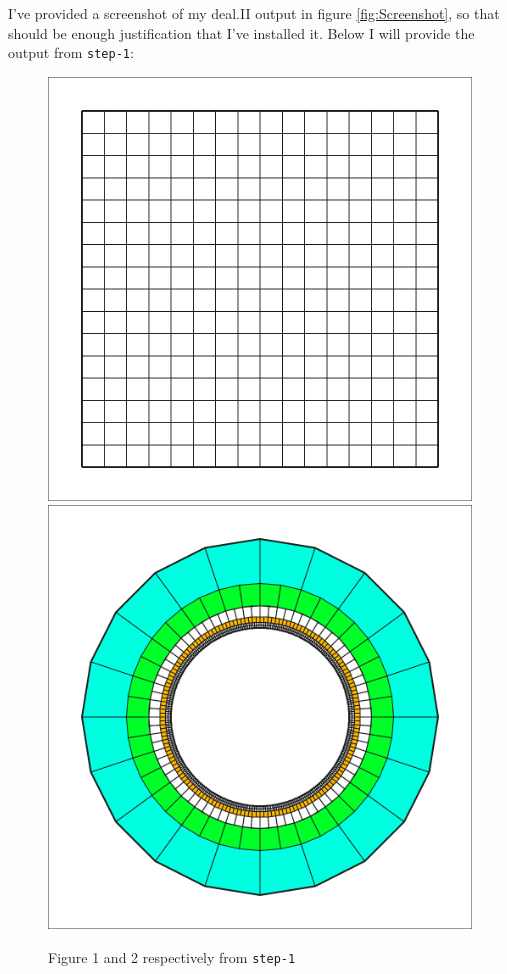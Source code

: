 \documentclass[12pt]{article}
\numberwithin{equation}{section}
\begin{document}
\begin{enumerate}
\begin{tcolorbox}[breakable]
I've provided a screenshot of my deal.II output in figure \ref{fig:Screenshot}, so that should be enough justification that I've installed it.  Below I will provide the output from \texttt{step-1}:
\begin{figure}[H]
\centering
\includegraphics[scale=.2]{grid-1.png}
\includegraphics[scale=.2]{grid-2.png}
\caption{Figure 1 and 2 respectively from \texttt{step-1}}
\end{figure}
\end{tcolorbox}
 	

\end{enumerate}
\end{document}
